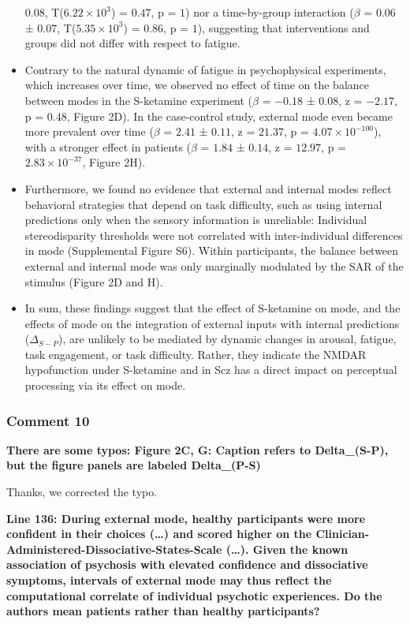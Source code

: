 \documentclass[
]{article}
\begin{document}
\begin{itemize}
  \(0.08\), T(\(\ensuremath{6.22\times 10^{3}}\)) = \(0.47\), p = \(1\))
  nor a time-by-group interaction (\(\beta\) = \(0.06\) ± \(0.07\),
  T(\(\ensuremath{5.35\times 10^{3}}\)) = \(0.86\), p = \(1\)),
  suggesting that interventions and groups did not differ with respect
  to fatigue.
\item
  Contrary to the natural dynamic of fatigue in psychophysical
  experiments, which increases over time, we observed no effect of time
  on the balance between modes in the S-ketamine experiment (\(\beta\) =
  \(-0.18\) ± \(0.08\), z = \(-2.17\), p = \(0.48\), Figure 2D). In the
  case-control study, external mode even became more prevalent over time
  (\(\beta\) = \(2.41\) ± \(0.11\), z = \(21.37\), p =
  \(\ensuremath{4.07\times 10^{-100}}\)), with a stronger effect in
  patients (\(\beta\) = \(1.84\) ± \(0.14\), z = \(12.97\), p =
  \(\ensuremath{2.83\times 10^{-37}}\), Figure 2H).
\item
  Furthermore, we found no evidence that external and internal modes
  reflect behavioral strategies that depend on task difficulty, such as
  using internal predictions only when the sensory information is
  unreliable: Individual stereodisparity thresholds were not correlated
  with inter-individual differences in mode (Supplemental Figure S6).
  Within participants, the balance between external and internal mode
  was only marginally modulated by the SAR of the stimulus (Figure 2D
  and H).
\item
  In sum, these findings suggest that the effect of S-ketamine on mode,
  and the effects of mode on the integration of external inputs with
  internal predictions (\(\Delta_{S-P}\)), are unlikely to be mediated
  by dynamic changes in arousal, fatigue, task engagement, or task
  difficulty. Rather, they indicate the NMDAR hypofunction under
  S-ketamine and in Scz has a direct impact on perceptual processing via
  its effect on mode.
\end{itemize}

\subsubsection{Comment 10}\label{comment-10}

\textbf{There are some typos: Figure 2C, G: Caption refers to
Delta\_(S-P), but the figure panels are labeled Delta\_(P-S)}

Thanks, we corrected the typo.

\textbf{Line 136: During external mode, healthy participants were more
confident in their choices (\ldots) and scored higher on the
Clinician-Administered-Dissociative-States-Scale (\ldots). Given the
known association of psychosis with elevated confidence and dissociative
symptoms, intervals of external mode may thus reflect the computational
correlate of individual psychotic experiences. Do the authors mean
patients rather than healthy participants?}
\end{document}
